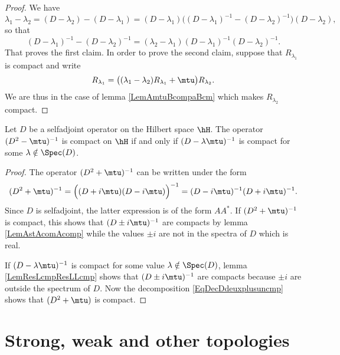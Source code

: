 \begin{proof}
	We have
	\begin{equation}
		\lambda_1-\lambda_2=(D-\lambda_2)-(D-\lambda_1)=(D-\lambda_1)\Big( (D-\lambda_1)^{-1}-(D-\lambda_2)^{-1} \Big)(D-\lambda_2),
	\end{equation}
	so that
	\begin{equation}
		(D-\lambda_1)^{-1}-(D-\lambda_2)^{-1}=(\lambda_2-\lambda_1)(D-\lambda_1)^{-1}(D-\lambda_2)^{-1}.
	\end{equation}
	That proves the first claim. In order to prove the second claim, suppose that $R_{\lambda_1}$ is compact and write
	\begin{equation}
		R_{\lambda_1}=\big( (\lambda_1-\lambda_2)R_{\lambda_1}+\mtu \big)R_{\lambda_2}.
	\end{equation}
	We are thus in the case of lemma \ref{LemAmtuBcompaBcm} which makes $R_{\lambda_2}$ compact.
\end{proof}

\begin{proposition}
	Let $D$ be a selfadjoint operator on the Hilbert space $\hH$. The operator $(D^2-\mtu)^{-1}$ is compact on $\hH$ if and only if $(D-\lambda\mtu)^{-1}$ is compact for some $\lambda\notin\Spec(D)$.
\end{proposition}

\begin{proof}
	The operator $(D^2+\mtu)^{-1}$ can be written under the form
	\begin{equation}		\label{EqDecDdeuxplusuncmp}
		(D^2+\mtu)^{-1}=\Big( (D+i\mtu)(D-i\mtu) \Big)^{-1}=(D-i\mtu)^{-1}(D+i\mtu)^{-1}.
	\end{equation}
	Since $D$ is selfadjoint, the latter expression is of the form $AA^*$. If $(D^2+\mtu)^{-1}$ is compact, this shows that $(D\pm i\mtu)^{-1}$ are compacts by lemma \ref{LemAstAcomAcomp} while the values $\pm i$ are not in the spectra of $D$ which is real.

	If $(D-\lambda\mtu)^{-1}$ is compact for some value $\lambda\notin\Spec(D)$, lemma \ref{LemResLcmpResLLcmp} shows that $(D\pm i\mtu)^{-1}$ are compacts because $\pm i$ are outside the spectrum of $D$. Now the decomposition \ref{EqDecDdeuxplusuncmp} shows that $(D^2+\mtu)$ is compact.
\end{proof}

					\section{Strong, weak and other topologies}


